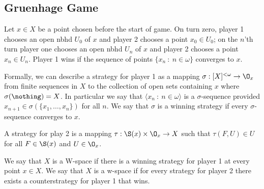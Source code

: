 \documentclass{article}
\begin{document}
\subsection{Gruenhage Game}

Let \(x \in X\) be a point chosen before the start of game. On turn zero, player 1 chooses an open nbhd \(U_0\) of \(x\) and player 2 chooses a point \(x_0 \in U_0\); on the \(n\)'th turn player one chooses an open nbhd \(U_n\) of \(x\) and player 2 chooses a point \(x_n \in U_n\). Player 1 wins if the sequence of points \(\{x_n \: : \: n \in \omega\}\) converges to \(x\).

Formally, we can describe a strategy for player 1 as a mapping \(\sigma: [X]^{<\omega} \to \O_x\) from finite sequences in \(X\) to the collection of open sets containing \(x\) where \(\sigma(\nothing) = X\). In particular we say that \(\langle x_n \: : \: n \in \omega\rangle\) is a \(\sigma\)-sequence provided \(x_{n + 1} \in \sigma(\{x_1, \dots, x_n\})\) for all \(n\). We say that \(\sigma\) is a winning strategy if every \(\sigma\)-sequence converges to \(x\).




A strategy for play 2 is a mapping \(\tau: \S(x) \times \O_x \to X\) such that \(\tau(F, U) \in U\) for all \(F \in \S(x)\) and \(U \in \O_x\).

\begin{defn}
    We say that \(X\) is a W-space if there is a winning strategy for player 1 at every point \(x \in X\).  We say that \(X\) is a w-space if for every strategy for player 2 there exists a counterstrategy for player 1 that wins.
\end{defn}
\end{document}
